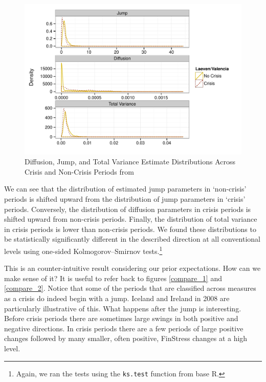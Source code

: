 \documentclass[]{article}
\begin{document}
\begin{figure}
    \caption{Diffusion, Jump, and Total Variance Estimate Distributions Across Crisis and Non-Crisis Periods from \cite{laeven2013}}
    \label{comp_jump_diff}
    \begin{center}
        \includegraphics[scale=0.7]{figures/compare_jump_diffusion_basic.pdf}
    \end{center}
\end{figure}

We can see that the distribution of estimated jump parameters in `non-crisis' periods is shifted upward from the distribution of jump parameters in `crisis' periods. Conversely, the distribution of diffusion parameters in crisis periods is shifted upward from non-crisis periods. Finally, the distribution of total variance in crisis periods is lower than non-crisis periods. We found these distributions to be statistically significantly different in the described direction at all conventional levels using one-sided Kolmogorov–Smirnov tests.\footnote{Again, we ran the tests using the \texttt{ks.test} function from base R.}

This is an counter-intuitive result considering our prior expectations. How can we make sense of it? It is useful to refer back to figures \ref{compare_1} and \ref{compare_2}. Notice that some of the periods that are classified across measures as a crisis do indeed begin with a jump. Iceland and Ireland in 2008 are particularly illustrative of this. What happens after the jump is interesting. Before crisis periods there are sometimes large swings in both positive and negative directions. In crisis periods there are a few periods of large positive changes followed by many smaller, often positive, FinStress changes at a high level.
\end{document}
